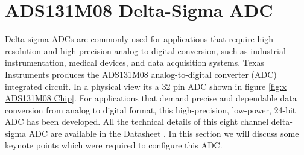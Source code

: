 \section{ADS131M08 Delta-Sigma ADC} \label{ADS131M08}
Delta-sigma ADCs are commonly used for applications that require high-resolution and high-precision analog-to-digital conversion, such as industrial instrumentation, medical devices, and data acquisition systems. Texas Instruments produces the ADS131M08 analog-to-digital converter (ADC) integrated circuit. In a physical view its a 32 pin ADC shown in figure \ref{fig:x ADS131M08 Chip}. For applications that demand precise and dependable data conversion from analog to digital format, this high-precision, low-power, 24-bit ADC has been developed. All the technical details of this eight channel delta-sigma ADC are available in the Datasheet \cite{ADSDatasheet}. In this section we will discuss some keynote points which were required to configure this ADC.
